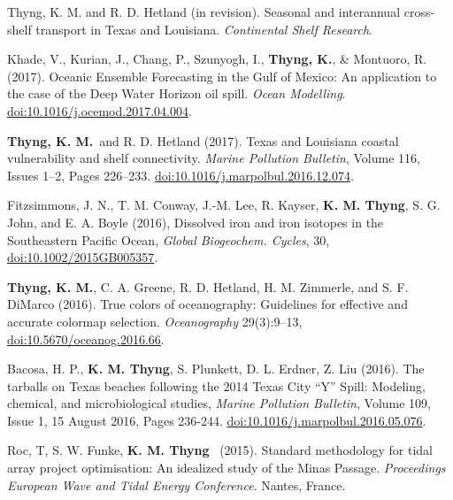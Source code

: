 \documentclass[10pt,letterpaper]{article}
\newcommand{\kmt}{\textbf{K. M. Thyng}}
\newcommand{\tkm}{\textbf{Thyng, K. M.}}
\renewenvironment{itemize}{
  \begin{list}{}{
    \setlength{\leftmargin}{1.5em}
    \setlength{\itemsep}{0.25em}
    \setlength{\parskip}{0pt}
    \setlength{\parsep}{0.25em}
  }
}{
  \end{list}
}
\begin{document}
\begin{itemize}

\item Thyng, K. M. and R. D. Hetland (in revision). Seasonal and interannual cross-shelf transport in Texas and Louisiana. \textit{Continental Shelf Research}.

\item Khade, V., Kurian, J., Chang, P., Szunyogh, I., \textbf{Thyng, K.}, & Montuoro, R. (2017). Oceanic Ensemble Forecasting in the Gulf of Mexico: An application to the case of the Deep Water Horizon oil spill. \textit{Ocean Modelling}.  \href{http://www.sciencedirect.com/science/article/pii/S1463500317300525}{doi:10.1016/j.ocemod.2017.04.004}.

\item \tkm~and R. D. Hetland (2017). Texas and Louisiana coastal vulnerability and shelf connectivity. \textit{Marine Pollution Bulletin}, Volume 116, Issues 1--2, Pages 226--233. \href{http://www.sciencedirect.com/science/article/pii/S0025326X16310773}{doi:10.1016/j.marpolbul.2016.12.074}.

\item Fitzsimmons, J. N., T. M. Conway, J.-M. Lee, R. Kayser, \kmt, S. G. John, and E. A. Boyle (2016), Dissolved iron and iron isotopes in the Southeastern Pacific Ocean, \textit{Global Biogeochem. Cycles}, 30,\\ \href{http://onlinelibrary.wiley.com/doi/10.1002/2015GB005357/full}{doi:10.1002/2015GB005357}.

\item \tkm, C. A. Greene, R. D. Hetland, H. M. Zimmerle, and S. F. DiMarco (2016). True colors of oceanography: Guidelines for effective and accurate colormap selection. \textit{Oceanography} 29(3):9--13,\\ \href{http://tos.org/oceanography/assets/docs/29-3_thyng.pdf}{doi:10.5670/oceanog.2016.66}.

\item Bacosa, H. P., \kmt, S. Plunkett, D. L. Erdner, Z. Liu (2016). The tarballs on Texas beaches following the 2014 Texas City ``Y'' Spill: Modeling, chemical, and microbiological studies, \textit{Marine Pollution Bulletin}, Volume 109, Issue 1, 15 August 2016, Pages 236-244. \href{http://www.sciencedirect.com/science/article/pii/S0025326X16303964}{doi:10.1016/j.marpolbul.2016.05.076}.

\item Roc, T, S. W. Funke, \kmt~ (2015). Standard methodology for tidal array project optimisation: An idealized study of the Minas Passage. \textit{Proceedings European Wave and Tidal Energy Conference}. Nantes, France.


\end{itemize}
\end{document}
